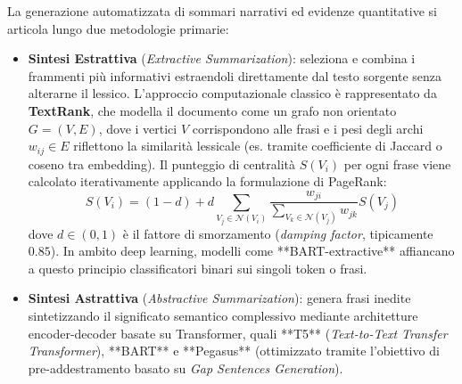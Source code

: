 \documentclass[11pt, a4paper]{article}
\begin{document}
La generazione automatizzata di sommari narrativi ed evidenze quantitative si articola lungo due metodologie primarie:
\begin{itemize}
    \item \textbf{Sintesi Estrattiva} (\emph{Extractive Summarization}): seleziona e combina i frammenti più informativi estraendoli direttamente dal testo sorgente senza alterarne il lessico. L'approccio computazionale classico è rappresentato da \textbf{TextRank}, che modella il documento come un grafo non orientato $G = (V, E)$, dove i vertici $V$ corrispondono alle frasi e i pesi degli archi $w_{ij} \in E$ riflettono la similarità lessicale (es. tramite coefficiente di Jaccard o coseno tra embedding). Il punteggio di centralità $S(V_i)$ per ogni frase viene calcolato iterativamente applicando la formulazione di PageRank:
    \begin{equation}
        S(V_i) = (1 - d) + d \sum_{V_j \in \mathcal{N}(V_i)} \frac{w_{ji}}{\sum_{V_k \in \mathcal{N}(V_j)} w_{jk}} S(V_j)
    \end{equation}
    dove $d \in (0, 1)$ è il fattore di smorzamento (\emph{damping factor}, tipicamente $0.85$). In ambito deep learning, modelli come **BART-extractive** affiancano a questo principio classificatori binari sui singoli token o frasi.
    \item \textbf{Sintesi Astrattiva} (\emph{Abstractive Summarization}): genera frasi inedite sintetizzando il significato semantico complessivo mediante architetture encoder-decoder basate su Transformer, quali **T5** (\emph{Text-to-Text Transfer Transformer}), **BART** e **Pegasus** (ottimizzato tramite l'obiettivo di pre-addestramento basato su \emph{Gap Sentences Generation}).
\end{itemize}
\end{document}

